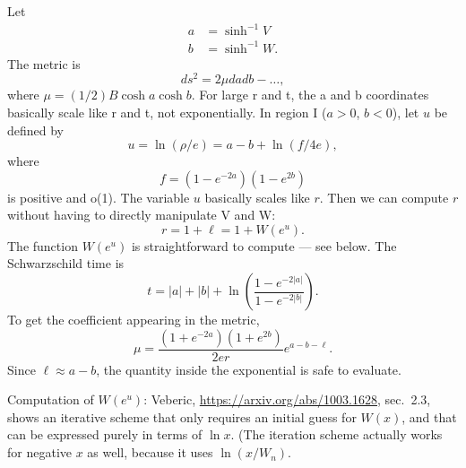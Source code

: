 \documentclass{article}
\begin{document}
Let
\begin{align*}
  a & = \sinh^{-1} V \\
  b & = \sinh^{-1} W. 
\end{align*}
The metric is
\begin{equation*}
  ds^2 = 2\mu dadb -\ldots,
\end{equation*}
where $\mu = (1/2)B\cosh a\cosh b$.
For large r and t, the a and b coordinates basically scale like r and t, not exponentially.
In region I ($a>0$, $b<0$), let $u$ be defined by
\begin{equation*}
  u = \ln(\rho/e) = a-b+\ln(f/4e),
\end{equation*}
where
\begin{equation*}
  f = (1-e^{-2a})(1-e^{2b})
\end{equation*}
is positive and o(1). The variable $u$ basically scales like $r$.
Then we can compute $r$ without having to directly manipulate V and W:
\begin{equation*}
  r = 1+\ell=1+W(e^u).
\end{equation*}
The function $W(e^u)$ is straightforward to compute --- see below.
The Schwarzschild time is
\begin{equation*}
  t = |a|+|b|+\ln\left(\frac{1-e^{-2|a|}}{1-e^{-2|b|}}\right).
\end{equation*}
To get the coefficient appearing in the metric,
\begin{equation*}
  \mu = \frac{(1+e^{-2a})(1+e^{2b})}{2er} e^{a-b-\ell}.
\end{equation*}
Since $\ell\approx a-b$, the quantity inside the exponential is safe to evaluate.

Computation of $W(e^u)$:
Veberic, \url{https://arxiv.org/abs/1003.1628}, sec.~2.3, shows an iterative
scheme that only requires an initial guess for $W(x)$, and that can be expressed purely
in terms of $\ln x$. (The iteration scheme actually works for negative $x$ as well, because
it uses $\ln(x/W_n)$.
\end{document}
